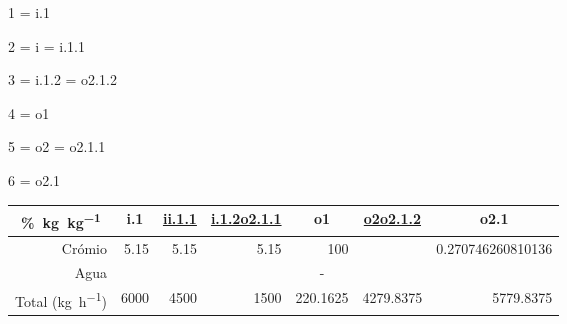 \documentclass[12pt]{article}
\begin{document}
\begin{center}

\begin{itemize}
\begin{multicols}{3}

	\item 1 = i.1
	\item 2 = i = i.1.1
	\item 3 = i.1.2 = o2.1.2
	\item 4 = o1
	\item 5 = o2 = o2.1.1
	\item 6 = o2.1
	
\end{multicols}
\end{itemize}

\vspace{5mm}

\begin{tabular}{ r *{6}{r} }

	\multicolumn{1}{c}{\unit{\percent.\kg\per\kg}}
	& \multicolumn{1}{c}{i.1}
	& \multicolumn{1}{c}{\underline{i\quad i.1.1}}
	& \multicolumn{1}{c}{\underline{i.1.2\quad o2.1.1}}
	& \multicolumn{1}{c}{o1}
	& \multicolumn{1}{c}{\underline{o2\quad o2.1.2}}
	& \multicolumn{1}{c}{o2.1}
	
	\\ \midrule
	
	Crómio
	& 5.15
	& 5.15
	& 5.15
	& 100
	& 
	& \num{0.270746260810136}
	
	\\
	
	Agua
	& 
	& 
	& 
	& \multicolumn{1}{c}{-}
	& 
	& 
	
	\\ \midrule
	
	Total (\unit{\kg\per\hour})
	& 6000
	& 4500
	& 1500
	& \num[round-precision=1]{220.1625}
	& \num[round-precision=1]
		 {4279.8375}
	& \num[round-precision=1]
		 {5779.8375}

\end{tabular}

\end{center}

\vspace{5mm}
\end{document}
